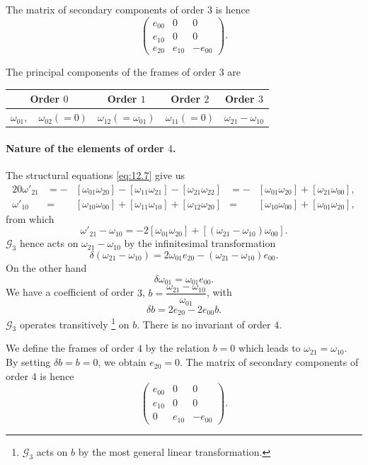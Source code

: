 \documentclass[leqno,11pt]{book}
\numberwithin{equation}{chapter}
\theoremstyle{shape1}
\theoremstyle{shapesmall}
\begin{document}
The matrix of secondary components of order $3$ is hence 
\[
\begin{pmatrix}
  e_{00}&0&0\\
  e_{10}&0&0\\
  e_{20}&e_{10}&-e_{00}
\end{pmatrix}.
\]

The principal components of the frames of order $3$ are
\begin{center}  
\begin{tabular}{|c|c|c|c|}
  \hline
  Order $0$&Order $1$&Order $2$&Order $3$\\
  \hline
  $\omega_{01},\quad\omega_{02}(=0)$&$\omega_{12}(=\omega_{01})$&$\omega_{11}(=0)$&$\omega_{21}-\omega_{10}$\\
  \hline
\end{tabular}
\end{center}


\paragraph{Nature of the elements of order $4$.}
\label{sec:178}
The structural equations \eqref{eq:12.7} give us
\begin{alignat*}{20}
  \omega'_{21}&{}=-{}&[\omega_{01}\omega_{20}]-[\omega_{11}\omega_{21}]-[\omega_{21}\omega_{22}]&{}=-{}&[\omega_{01}\omega_{20}]+[\omega_{21}\omega_{00}],\\
  \omega'_{10}&{}={}&[\omega_{10}\omega_{00}]+[\omega_{11}\omega_{10}]+[\omega_{12}\omega_{20}]&{}={}&[\omega_{10}\omega_{00}]+[\omega_{01}\omega_{20}],
\end{alignat*}
from which
\[
\omega'_{21}-\omega_{10}=-2[\omega_{01}\omega_{20}]+[(\omega_{21}-\omega_{10})\omega_{00}].
\]
$\mathcal{G}_{3}$ hence acts on $\omega_{21}-\omega_{10}$ by the infinitesimal transformation
\[
\delta(\omega_{21}-\omega_{10})=2\omega_{01}e_{20}-(\omega_{21}-\omega_{10})e_{00}.
\]
On the other hand
\[
\delta\omega_{01}=\omega_{01}e_{00}.
\]
We have a coefficient of order $3$, $b=\dfrac{\omega_{21}-\omega_{10}}{\omega_{01}}$, with
\[
\delta b=2e_{20}-2e_{00}b.
\]
$\mathcal{G}_{3}$ operates transitively \footnote{$\mathcal{G}_3$ acts on $b$ by the most general linear transformation.} on $b$. There is no invariant of order $4$.

We define the frames of order $4$ by the relation $b=0$ which leads to $\omega_{21}=\omega_{10}$. By setting $\delta b=b=0$, we obtain $e_{20}=0$. The matrix of secondary components of order $4$ is hence 
\[
\begin{pmatrix}
  e_{00}&0&0\\
  e_{10}&0&0\\
  0&e_{10}&-e_{00}
\end{pmatrix}.
\]
\end{document}
